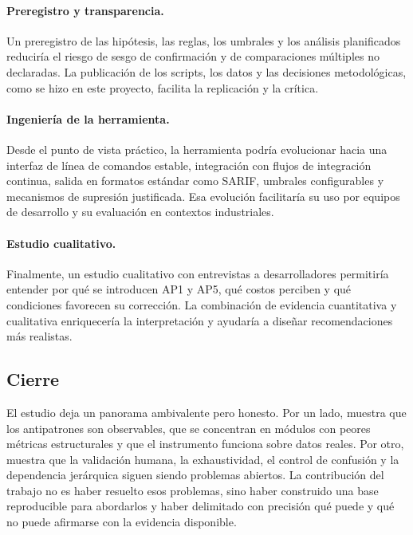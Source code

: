 \paragraph{Preregistro y transparencia.} Un preregistro de las hipótesis, las reglas, los umbrales y los análisis planificados reduciría el riesgo de sesgo de confirmación y de comparaciones múltiples no declaradas. La publicación de los scripts, los datos y las decisiones metodológicas, como se hizo en este proyecto, facilita la replicación y la crítica.

\paragraph{Ingeniería de la herramienta.} Desde el punto de vista práctico, la herramienta podría evolucionar hacia una interfaz de línea de comandos estable, integración con flujos de integración continua, salida en formatos estándar como SARIF, umbrales configurables y mecanismos de supresión justificada. Esa evolución facilitaría su uso por equipos de desarrollo y su evaluación en contextos industriales.

\paragraph{Estudio cualitativo.} Finalmente, un estudio cualitativo con entrevistas a desarrolladores permitiría entender por qué se introducen AP1 y AP5, qué costos perciben y qué condiciones favorecen su corrección. La combinación de evidencia cuantitativa y cualitativa enriquecería la interpretación y ayudaría a diseñar recomendaciones más realistas.

\subsection{Cierre}

El estudio deja un panorama ambivalente pero honesto. Por un lado, muestra que los antipatrones son observables, que se concentran en módulos con peores métricas estructurales y que el instrumento funciona sobre datos reales. Por otro, muestra que la validación humana, la exhaustividad, el control de confusión y la dependencia jerárquica siguen siendo problemas abiertos. La contribución del trabajo no es haber resuelto esos problemas, sino haber construido una base reproducible para abordarlos y haber delimitado con precisión qué puede y qué no puede afirmarse con la evidencia disponible.
